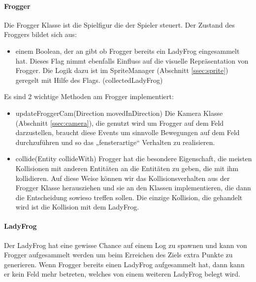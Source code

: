 \documentclass[a4paper,10pt]{report}
\begin{document}
{{{				\paragraph{Frogger}
				{
					Die Frogger Klasse ist die Spielfigur die der Spieler steuert.
					\newline \newline
					Der Zustand des Froggers bildet sich aus:
					\begin{itemize}
						\item einem Boolean, der an gibt ob Frogger bereits ein LadyFrog eingesammelt hat. Dieses Flag nimmt ebenfalls Einfluss auf die visuelle Repräsentation von Frogger. 
							  Die Logik dazu ist im SpriteManager (Abschnitt \ref{ssec:sprite}) geregelt mit Hilfe des Flags. (collectedLadyFrog) 
					\end{itemize}
					\noindent 
					Es sind 2 wichtige Methoden am Frogger implementiert:
					
					\begin{itemize}
						\item updateFroggerCam(Direction movedInDirection) Die Kamera Klasse (Abschnitt \ref{ssec:camera}), die genutzt wird um Frogger auf dem Feld darzustellen, 
						      braucht diese Events um sinnvolle Bewegungen auf dem Feld durchzuführen und so das „fensterartige“ Verhalten zu realisieren.

						\item collide(Entity collideWith) Frogger hat die besondere Eigenschaft, die meisten Kollisionen mit anderen Entitäten an die
							  Entitäten zu geben, die mit ihm kollidieren. Auf diese Weise können wir das Kollisionsverhalten aus der Frogger Klasse herausziehen und sie an den Klassen implementieren, 
							  die dann die Entscheidung sowieso treffen sollen. Die einzige Kollision, die gehandelt wird ist die Kollision mit dem LadyFrog.
					\end{itemize}																						
				}
				
				\paragraph{LadyFrog}
				{
					Der LadyFrog hat eine gewisse Chance auf einem Log zu spawnen und kann von Frogger aufgesammelt werden um beim Erreichen des Ziels extra Punkte zu generieren.
					Wenn Frogger bereits einen LadyFrog aufgesammelt hat, dann kann er kein Feld mehr betreten, welches von einem weiteren LadyFrog belegt wird.	
				}						
			}				
						
}}
\end{document}
